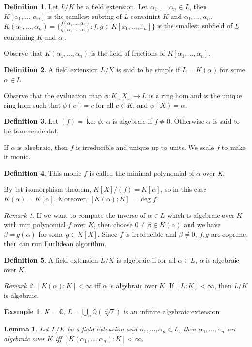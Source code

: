 \documentclass{article}
\theoremstyle{definition}
\newtheorem*{defn*}{Definition}
\newtheorem{example}[defn]{Example}
\theoremstyle{remark}
\newtheorem{rem}{Remark}
\theoremstyle{plain}
\newtheorem{lem}[defn]{Lemma}
\newcommand{\QQ}{\mathbb{Q}}
\begin{document}
\begin{defn*}
    Let $L/K$ be a field extension. Let $\alpha_1,...,\alpha_n\in L$, then $K[\alpha_1,...,\alpha_n]$ is the samllest subring of $L$ containint $K$ and $\alpha_1,...,\alpha_n$. $K(\alpha_1,...,\alpha_n)=\{\frac{f(\alpha_1,...,\alpha_n)}{g(\alpha_1,...,\alpha_n)}:f,g\in K[x_1,...,x_n]\}$ is the smallest subfield of $L$ containing $K$ and $\alpha_i$.
\end{defn*}
Observe that $K(\alpha_1,...,\alpha_n)$ is the field of fractions of $K[\alpha_1,...,\alpha_n]$.
\begin{defn*}
    A field extension $L/K$ is said to be simple if $L=K(\alpha)$ for some $\alpha\in L$.
\end{defn*}
Observe that the evaluation map $\phi:K[X]\to L$ is a ring hom and is the unique ring hom such that $\phi(c)=c$ for all $c\in K$, and $\phi(X)=\alpha$.
\begin{defn*}
    Let $(f)=\ker\phi$. $\alpha$ is algebraic if $f\neq 0$. Otherwise $\alpha$ is said to be transcendental.
\end{defn*}
If $\alpha$ is algebraic, then $f$ is irreducible and unique up to units. We scale $f$ to make it monic.
\begin{defn*}
    This monic $f$ is called the minimal polynomial of $\alpha$ over $K$.
\end{defn*}
By 1st isomorphism theorem, $K[X]/(f)=K[\alpha]$, so in this case $K(\alpha)=K[\alpha]$. Moreover, $[K(\alpha);K]=\deg f$.
\begin{rem}
    If we want to compute the inverse of $\alpha\in L$ which is algebraic over $K$ with min polynomial $f$ over $K$, then choose $0\neq\beta\in K(\alpha)$ and we have $\beta=g(\alpha)$ for some $g\in K[X]$. Since $f$ is irreducible and $\beta\neq 0$, $f,g$ are coprime, then can run Euclidean algorithm.
\end{rem}
\begin{defn*}
    A field extension $L/K$ is algebraic if for all $\alpha\in L$, $\alpha$ is algebraic over $K$.
\end{defn*}
\begin{rem}
    $[K(\alpha):K]<\infty$ iff $\alpha$ is algebraic over $K$.
    If $[L:K]<\infty$, then $L/K$ is algebraic.
\end{rem}
\begin{example}
    $K=\QQ$, $L=\bigcup_n\QQ(\sqrt[2^n]{2})$ is an infinite algebraic extension.
\end{example}
\begin{lem}
    Let $L/K$ be a field extension and $\alpha_1,...,\alpha_n\in L$, then $\alpha_1,...,\alpha_n$ are algebraic over $K$ iff $[K(\alpha_1,...,\alpha_n):K]<\infty$.
\end{lem}
\end{document}
